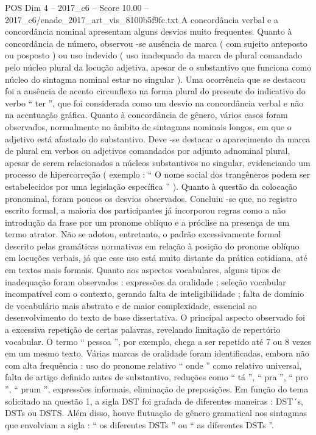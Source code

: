 \begin{textsample}{POS Dim 4 – 2017\_c6 – Score 10.00 – 2017\_c6/enade\_2017\_art\_vis\_8100b5f9fc.txt}
A concordância verbal e a concordância nominal apresentam alguns desvios muito frequentes.
Quanto à concordância de número, observou -se ausência de marca ( com sujeito anteposto ou posposto ) ou uso indevido ( uso inadequado da marca de plural comandado pelo núcleo plural da locução adjetiva, apesar de o substantivo que funciona como núcleo do sintagma nominal estar no singular ).
Uma ocorrência que se destacou foi a ausência de acento circunflexo na forma plural do presente do indicativo do verbo “ ter ”, que foi considerada como um desvio na concordância verbal e não na acentuação gráfica.
Quanto à concordância de gênero, vários casos foram observados, normalmente no âmbito de sintagmas nominais longos, em que o adjetivo está afastado do substantivo.
Deve -se destacar o aparecimento da marca de plural em verbos ou adjetivos comandados por adjunto adnominal plural, apesar de serem relacionados a núcleos substantivos no singular, evidenciando um processo de hipercorreção ( exemplo : “ O nome social dos trangêneros podem ser estabelecidos por uma legislação específica ” ).
Quanto à questão da colocação pronominal, foram poucos os desvios observados.
Concluiu -se que, no registro escrito formal, a maioria dos participantes já incorporou regras como a não introdução da frase por um pronome oblíquo e a próclise na presença de um termo atrator.
Não se adotou, entretanto, o padrão excessivamente formal descrito pelas gramáticas normativas em relação à posição do pronome oblíquo em locuções verbais, já que esse uso está muito distante da prática cotidiana, até em textos mais formais.
Quanto aos aspectos vocabulares, alguns tipos de inadequação foram observados : expressões da oralidade ; seleção vocabular incompatível com o contexto, gerando falta de inteligibilidade ; falta de domínio de vocabulário mais abstrato e de maior complexidade, essencial ao desenvolvimento do texto de base dissertativa.
O principal aspecto observado foi a excessiva repetição de certas palavras, revelando limitação de repertório vocabular.
O termo “ pessoa ”, por exemplo, chega a ser repetido até 7 ou 8 vezes em um mesmo texto.
Várias marcas de oralidade foram identificadas, embora não com alta frequência : uso do pronome relativo “ onde ” como relativo universal, falta de artigo definido antes de substantivo, reduções como “ tá ”, “ pra ”, “ pro ”, “ prum ”, expressões informais, eliminação de preposições.
Em função do tema solicitado na questão 1, a sigla DST foi grafada de diferentes maneiras : DST´s, DSTs ou DSTS.
Além disso, houve flutuação de gênero gramatical nos sintagmas que envolviam a sigla : “ os diferentes DSTs ” ou “ as diferentes DSTs ”.

\end{textsample}
